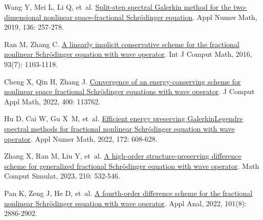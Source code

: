 \begin{thebibliography}{77}
    Wang Y, Mei L, Li Q, et~al.
    \newblock \href{https://linkinghub.elsevier.com/retrieve/pii/S0168927418302393}{Split-step spectral {{Galerkin}} method for the two-dimensional nonlinear space-fractional {{Schr{\"o}dinger}} equation}\allowbreak[J].
    \newblock Appl Numer Math, 2019, 136: 257-278.
    
    Ran M, Zhang C.
    \newblock \href{http://www.tandfonline.com/doi/full/10.1080/00207160.2015.1016924}{A linearly implicit conservative scheme for the fractional nonlinear {{Schr{\"o}dinger}} equation with wave operator}\allowbreak[J].
    \newblock Int J Comput Math, 2016, 93\allowbreak (7): 1103-1118.
    
    Cheng X, Qin H, Zhang J.
    \newblock \href{https://linkinghub.elsevier.com/retrieve/pii/S0377042721003848}{Convergence of an energy-conserving scheme for nonlinear space fractional {{Schr{\"o}dinger}} equations with wave operator}\allowbreak[J].
    \newblock J Comput Appl Math, 2022, 400: 113762.
    
    Hu D, Cai W, Gu X~M, et~al.
    \newblock \href{https://linkinghub.elsevier.com/retrieve/pii/S0168927421002981}{Efficient energy preserving {{Galerkin}}{\textendash}{{Legendre}} spectral methods for fractional nonlinear {{Schr{\"o}dinger}} equation with wave operator}\allowbreak[J].
    \newblock Appl Numer Math, 2022, 172: 608-628.
    
    Zhang X, Ran M, Liu Y, et~al.
    \newblock \href{https://www.sciencedirect.com/science/article/pii/S0378475423001325}{A high-order structure-preserving difference scheme for generalized fractional {{Schr{\"o}dinger}} equation with wave operator}\allowbreak[J].
    \newblock Math Comput Simulat, 2023, 210: 532-546.
    
    Pan K, Zeng J, He D, et~al.
    \newblock \href{https://doi.org/10.1080/00036811.2020.1829600}{A fourth-order difference scheme for the fractional nonlinear {{Schr{\"o}dinger}} equation with wave operator}\allowbreak[J].
    \newblock Appl Anal, 2022, 101\allowbreak (8): 2886-2902.
    

\end{thebibliography}
